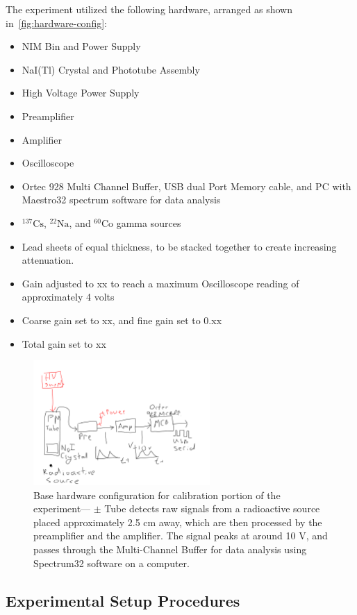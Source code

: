 \documentclass[a4paper]{article}
\begin{document}
The experiment utilized the following hardware, arranged as shown in~\autoref{fig:hardware-config}:
\begin{itemize}
\item NIM Bin and Power Supply
\item NaI(Tl) Crystal and Phototube Assembly
\item High Voltage Power Supply
\item Preamplifier
\item Amplifier
\item Oscilloscope
\item Ortec 928 Multi Channel Buffer, USB dual Port Memory cable, and PC with Maestro32 spectrum software for data analysis
\item $^{137}\mathrm{Cs}$, $^{22}\mathrm{Na}$, and $^{60}\mathrm{Co}$ gamma sources
\item Lead sheets of equal thickness, to be stacked together to create increasing attenuation.
\item Gain adjusted to xx to reach a maximum Oscilloscope reading of approximately 4 volts
\item Coarse gain set to xx, and fine gain set to 0.xx
\item Total gain set to xx
\end{itemize}

\begin{figure}[H]
\centering
\includegraphics[width=0.6\textwidth]{figures/experiment-setup.pdf}
\caption{Base hardware configuration for calibration portion of the experiment--- $\pm$ Tube detects raw signals from a radioactive source placed approximately 2.5 cm away, which are then processed by the preamplifier and the amplifier. The signal peaks at around 10 V, and passes through the Multi-Channel Buffer for data analysis using Spectrum32 software on a computer.}
\label{fig:hardware-config}
\end{figure}
\subsection{Experimental Setup Procedures}
\end{document}
